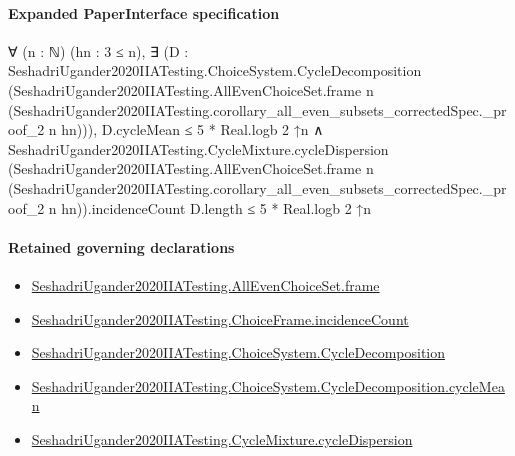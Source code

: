 \documentclass[10pt]{article}
\begin{document}
\paragraph{Expanded PaperInterface specification}
\begin{ReviewVerbatim}
∀ (n : ℕ) (hn : 3 ≤ n),
  ∃ (D :
    SeshadriUgander2020IIATesting.ChoiceSystem.CycleDecomposition
      (SeshadriUgander2020IIATesting.AllEvenChoiceSet.frame n
        (SeshadriUgander2020IIATesting.corollary_all_even_subsets_correctedSpec._proof_2 n hn))),
    D.cycleMean ≤ 5 * Real.logb 2 ↑n ∧
      SeshadriUgander2020IIATesting.CycleMixture.cycleDispersion
          (SeshadriUgander2020IIATesting.AllEvenChoiceSet.frame n
              (SeshadriUgander2020IIATesting.corollary_all_even_subsets_correctedSpec._proof_2 n hn)).incidenceCount
          D.length ≤
        5 * Real.logb 2 ↑n
\end{ReviewVerbatim}

\paragraph{Retained governing declarations}
\begin{itemize}\raggedright
\item \hyperlink{governing-declaration-22a9ee4380202cd0}{Seshadri\allowbreak{}Ugander2020\allowbreak{}IIA\allowbreak{}Testing.\allowbreak{}All\allowbreak{}Even\allowbreak{}Choice\allowbreak{}Set.\allowbreak{}frame}
\item \hyperlink{governing-declaration-01f88aa0e8a82d94}{Seshadri\allowbreak{}Ugander2020\allowbreak{}IIA\allowbreak{}Testing.\allowbreak{}Choice\allowbreak{}Frame.\allowbreak{}incidence\allowbreak{}Count}
\item \hyperlink{paper-prerequisite-7ec2ce004f72e29f}{Seshadri\allowbreak{}Ugander2020\allowbreak{}IIA\allowbreak{}Testing.\allowbreak{}Choice\allowbreak{}System.\allowbreak{}Cycle\allowbreak{}Decomposition}
\item \hyperlink{paper-prerequisite-4f9c0f894e80708f}{Seshadri\allowbreak{}Ugander2020\allowbreak{}IIA\allowbreak{}Testing.\allowbreak{}Choice\allowbreak{}System.\allowbreak{}Cycle\allowbreak{}Decomposition.\allowbreak{}cycle\allowbreak{}Mean}
\item \hyperlink{paper-prerequisite-d1b6db8e571d96c2}{Seshadri\allowbreak{}Ugander2020\allowbreak{}IIA\allowbreak{}Testing.\allowbreak{}Cycle\allowbreak{}Mixture.\allowbreak{}cycle\allowbreak{}Dispersion}
\end{itemize}
\end{document}
